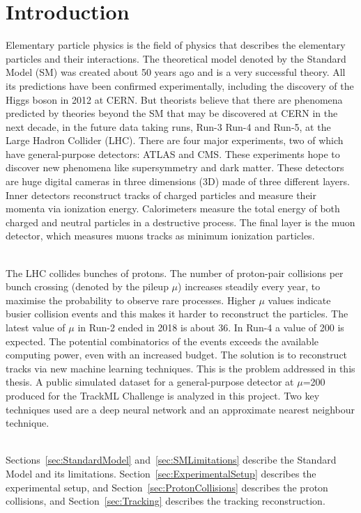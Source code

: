 \chapter{Introduction}
\label{chapter:Introduction}

Elementary particle physics is the field of physics that describes the elementary particles and their interactions. The theoretical model denoted by the Standard Model (SM) was created about 50 years ago and is a very successful theory. All its predictions have been confirmed experimentally, including the discovery of the Higgs boson in 2012 at CERN. But theorists believe that there are phenomena predicted by theories beyond the SM that may be discovered at CERN in the next decade, in the future data taking runs, Run-3 Run-4 and Run-5, at the Large Hadron Collider (LHC). There are four major experiments, two of which have general-purpose detectors: ATLAS and CMS. These experiments hope to discover new phenomena like supersymmetry and dark matter. These detectors are huge digital cameras in three dimensions (3D) made of three different layers. Inner detectors reconstruct tracks of charged particles and measure their momenta via ionization energy. Calorimeters measure the total energy of both charged and neutral particles in a destructive process. The final layer is the muon detector, which measures muons tracks as minimum ionization particles.

\ \\The LHC collides bunches of protons. The number of proton-pair collisions per bunch crossing (denoted by the pileup $\mu$) increases steadily every year, to maximise the probability to observe rare processes. Higher $\mu$ values indicate busier collision events and this makes it harder to reconstruct the particles. The latest value of $\mu$ in Run-2 ended in 2018 is about 36. In Run-4 a value of 200 is expected. The potential combinatorics of the events exceeds the available computing power, even with an increased budget. The solution is to reconstruct tracks via new machine learning techniques. This is the problem addressed in this thesis. A public simulated dataset for a general-purpose detector at $\mu$=200 produced for the TrackML Challenge is analyzed in this project. Two key techniques used are a deep neural network and an approximate nearest neighbour technique.

\ \\Sections~\ref{sec:StandardModel} and~\ref{sec:SMLimitations} describe the Standard Model and its limitations. Section~\ref{sec:ExperimentalSetup} describes the experimental setup, and Section~\ref{sec:ProtonCollisions} describes the proton collisions, and Section~\ref{sec:Tracking} describes the tracking reconstruction.

